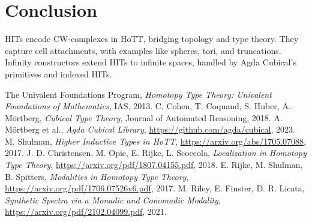 \documentclass{article}
\theoremstyle{definition}
\begin{document}
\section{Conclusion}
HITs encode CW-complexes in HoTT, bridging topology and type theory.
They capture cell attachments, with examples like spheres, tori, and truncations.
Infinity constructors extend HITs to infinite spaces, handled by Agda Cubical’s primitives and indexed HITs.


\begin{thebibliography}{9}
The Univalent Foundations Program, \emph{Homotopy Type Theory: Univalent Foundations of Mathematics}, IAS, 2013.
C. Cohen, T. Coquand, S. Huber, A. Mörtberg, \emph{Cubical Type Theory}, Journal of Automated Reasoning, 2018.
A. Mörtberg et al., \emph{Agda Cubical Library}, \url{https://github.com/agda/cubical}, 2023.
M. Shulman, \emph{Higher Inductive Types in HoTT}, \url{https://arxiv.org/abs/1705.07088}, 2017.
J. D. Christensen, M. Opie, E. Rijke, L. Scoccola, \emph{Localization in Homotopy Type Theory}, \url{https://arxiv.org/pdf/1807.04155.pdf}, 2018.
E. Rijke, M. Shulman, B. Spitters, \emph{Modalities in Homotopy Type Theory}, \url{https://arxiv.org/pdf/1706.07526v6.pdf}, 2017.
M. Riley, E. Finster, D. R. Licata, \emph{Synthetic Spectra via a Monadic and Comonadic Modality}, \url{https://arxiv.org/pdf/2102.04099.pdf}, 2021.
\end{thebibliography}
\end{document}
